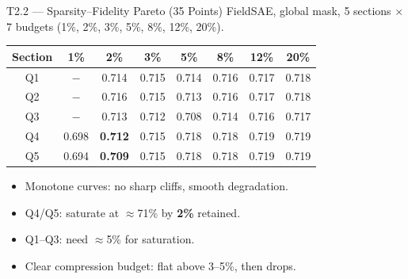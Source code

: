 \documentclass[final]{beamer}
\newlength{\colwidth}
\begin{document}
\begin{frame}[t]
\begin{columns}[t]
\begin{column}{\colwidth}
\vspace{0.5em}

\begin{block}{T2.2 --- Sparsity--Fidelity Pareto (35 Points)}
\small
FieldSAE, global mask, 5 sections $\times$ 7 budgets (1\%, 2\%, 3\%, 5\%, 8\%, 12\%, 20\%).

\vspace{0.2em}
\begin{center}
\begin{tabular}{@{}cccccccc@{}}
\toprule
\textbf{Section} & \textbf{1\%} & \textbf{2\%} & \textbf{3\%} & \textbf{5\%} & \textbf{8\%} & \textbf{12\%} & \textbf{20\%} \\
\midrule
Q1 & $-$ & 0.714 & 0.715 & 0.714 & 0.716 & 0.717 & 0.718 \\
Q2 & $-$ & 0.716 & 0.715 & 0.713 & 0.716 & 0.717 & 0.718 \\
Q3 & $-$ & 0.713 & 0.712 & 0.708 & 0.714 & 0.716 & 0.717 \\
Q4 & 0.698 & \textbf{0.712} & 0.715 & 0.718 & 0.718 & 0.719 & 0.719 \\
Q5 & 0.694 & \textbf{0.709} & 0.715 & 0.718 & 0.718 & 0.719 & 0.719 \\
\bottomrule
\end{tabular}
\end{center}

\begin{itemize}[leftmargin=1.5em,itemsep=1pt]
  \item Monotone curves: no sharp cliffs, smooth degradation.
  \item Q4/Q5: saturate at $\approx$71\% by \textbf{2\%} retained.
  \item Q1--Q3: need $\approx$5\% for saturation.
  \item Clear compression budget: flat above 3--5\%, then drops.
\end{itemize}
\end{block}

\vspace{0.5em}


\end{column}
\end{columns}
\end{frame}
\end{document}
